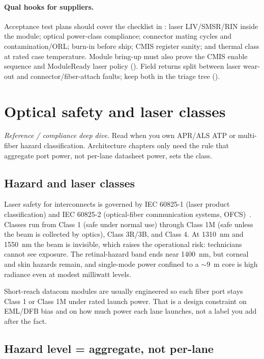\paragraph{Qual hooks for suppliers.}
Acceptance test plans should cover the checklist in
:
laser LIV/SMSR/RIN inside the module; optical power-class compliance; connector
mating cycles and contamination/ORL; burn-in before ship; CMIS register sanity;
and thermal class at rated case temperature. Module bring-up must also prove the
CMIS enable sequence and ModuleReady laser policy (). Field
returns split between laser wear-out and connector/fiber-attach faults; keep both
in the triage tree ().

\section{Optical safety and laser classes}
\label{sec:laser-safety}

\textit{Reference / compliance deep dive.} Read when you own APR/ALS ATP or
multi-fiber hazard classification. Architecture chapters only need the rule that
aggregate port power, not per-lane datasheet power, sets the class.

\subsection{Hazard and laser classes}

Laser safety for interconnects is governed by IEC 60825-1 (laser product
classification) and IEC 60825-2 (optical-fiber communication systems,
OFCS)~\cite{iec60825}. Classes run from Class 1 (safe under normal use) through
Class 1M (safe unless the beam is collected by optics), Class 3R/3B, and Class 4.
At 1310~nm and 1550~nm the beam is invisible, which raises the operational risk:
technicians cannot see exposure. The retinal-hazard band ends near 1400~nm, but
corneal and skin hazards remain, and single-mode power confined to a $\sim$9~\textmu m
core is high radiance even at modest milliwatt levels.

Short-reach datacom modules are usually engineered so each fiber port stays Class 1
or Class 1M under rated launch power. That is a design constraint on EML/DFB bias
and on how much power each lane launches, not a label you add after the fact.

\subsection{Hazard level = aggregate, not per-lane}

